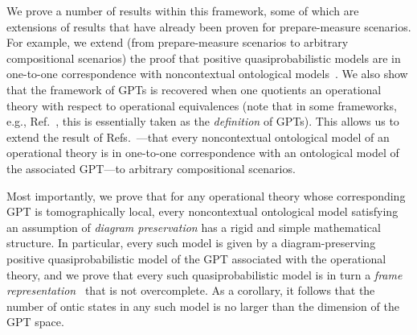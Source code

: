 \documentclass[10pt,twocolumn,aps,groupedaddress,nofootinbib]{revtex4}
\newcommand{\david}{\color{blue}}
\newcommand{\blk}{\color{black}}
\newcommand{\rnote}[1]{{\color{cyan}[Rob: #1]}}
\begin{document}
We prove a number of results within this framework, some of which are extensions of results that have already been proven for prepare-measure scenarios.
For example, we extend (from prepare-measure scenarios to arbitrary compositional scenarios)
 the proof that positive quasiprobabilistic models are in one-to-one correspondence with
noncontextual ontological models~\cite{Spekkens2008}.
We also show that  the framework of GPTs is recovered when one quotients an operational theory with respect to operational equivalences (note that in some frameworks, e.g., Ref.~\cite{chiribella2010probabilistic}, this is essentially taken as the {\em definition} of GPTs).
This allows us to extend the result of Refs.~\cite{schmid2019characterization,shahandeh2019contextuality}---that every noncontextual ontological model of an operational theory is in one-to-one correspondence with an ontological model of the associated GPT---to arbitrary compositional scenarios.

 Most importantly, we prove that for any operational theory whose corresponding GPT is tomographically local, every noncontextual ontological model satisfying an assumption of {\em diagram preservation}  has a rigid and simple mathematical structure. 
In particular, every such model is given by a diagram-preserving positive quasiprobabilistic model of the GPT associated with the operational theory, and we prove that every such quasiprobabilistic model is in turn a {\em frame representation}~\cite{ferrie2008frame,Ferrie_2009} that is not overcomplete.
As a corollary, it follows that the number of ontic states in any such model is no larger than the dimension of the GPT space.
\end{document}
